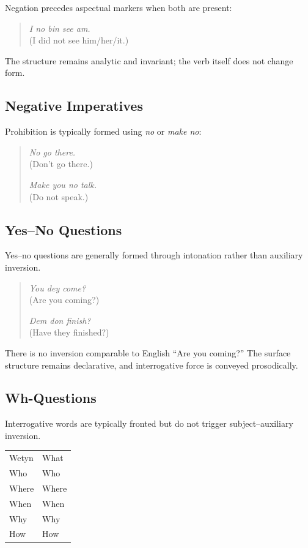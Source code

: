 \documentclass[12pt]{article}
\begin{document}
Negation precedes aspectual markers when both are present:

\begin{quote}
\textit{I no bin see am.} \\
(I did not see him/her/it.)
\end{quote}

The structure remains analytic and invariant; the verb itself does not change form.

\subsection{Negative Imperatives}

Prohibition is typically formed using \textit{no} or \textit{make no}:

\begin{quote}
\textit{No go there.} \\
(Don't go there.)

\textit{Make you no talk.} \\
(Do not speak.)
\end{quote}

\subsection{Yes--No Questions}

Yes--no questions are generally formed through intonation rather than auxiliary inversion.

\begin{quote}
\textit{You dey come?} \\
(Are you coming?)

\textit{Dem don finish?} \\
(Have they finished?)
\end{quote}

There is no inversion comparable to English “Are you coming?” The surface structure remains declarative, and interrogative force is conveyed prosodically.

\subsection{Wh-Questions}

Interrogative words are typically fronted but do not trigger subject--auxiliary inversion.

\begin{center}
\begin{tabular}{ll}
Wetyn & What \\
Who & Who \\
Where & Where \\
When & When \\
Why & Why \\
How & How \\
\end{tabular}
\end{center}
\end{document}
